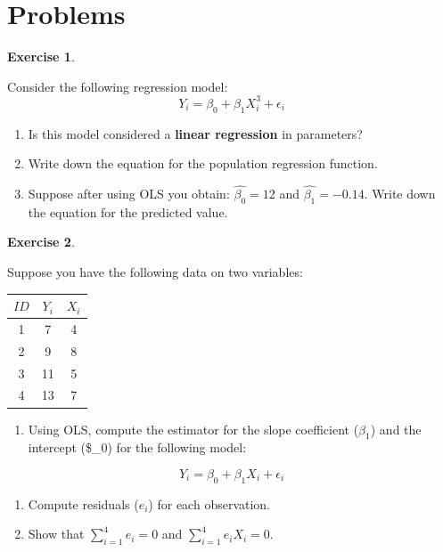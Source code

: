 \documentclass[
]{book}
\providecommand{\tightlist}{%
  \setlength{\itemsep}{0pt}\setlength{\parskip}{0pt}}
\theoremstyle{definition}
\theoremstyle{definition}
\theoremstyle{definition}
\newtheorem{exercise}{Exercise}[chapter]
\theoremstyle{definition}
\theoremstyle{remark}
\begin{document}
\hypertarget{problems-2}{%
\section*{Problems}\label{problems-2}}

\begin{exercise}
\protect\hypertarget{exr:unnamed-chunk-72}{}\label{exr:unnamed-chunk-72}

Consider the following regression model:\[Y_i= \beta_0 + \beta_1 X_i^3 + \epsilon_i\]

\begin{enumerate}
\def\labelenumi{\alph{enumi}.}
\item
  Is this model considered a \textbf{linear regression} in parameters?
\item
  Write down the equation for the population regression function.
\item
  Suppose after using OLS you obtain: \(\hat{\beta_0}=12\) and \(\hat{\beta_1}=-0.14\). Write down the equation for the predicted value.
\end{enumerate}

\end{exercise}

\begin{exercise}
\protect\hypertarget{exr:unnamed-chunk-73}{}\label{exr:unnamed-chunk-73}

Suppose you have the following data on two variables:

\begin{longtable}[]{@{}ccc@{}}
\toprule()
\(ID\) & \(Y_i\) & \(X_i\) \\
\midrule()
\endhead
1 & 7 & 4 \\
2 & 9 & 8 \\
3 & 11 & 5 \\
4 & 13 & 7 \\
\bottomrule()
\end{longtable}

\begin{enumerate}
\def\labelenumi{\alph{enumi}.}
\tightlist
\item
  Using OLS, compute the estimator for the slope coefficient (\(\beta_1\)) and the intercept (\$\beta\_0) for the following model:
\end{enumerate}

\[Y_i = \beta_0 + \beta_1 X_i + \epsilon_i\]

\begin{enumerate}
\def\labelenumi{\alph{enumi}.}
\setcounter{enumi}{1}
\item
  Compute residuals (\(e_i\)) for each observation.
\item
  Show that \(\sum_{i=1}^4 e_i=0\) and \(\sum_{i=1}^4 e_iX_i=0\).
\end{enumerate}

\end{exercise}
\end{document}
